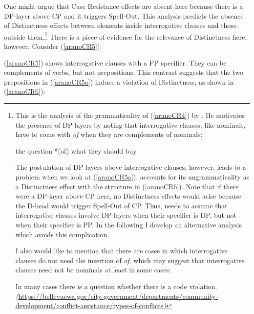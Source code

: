\documentclass[output=paper]{langscibook}
\begin{document}
\noindent One might argue that Case Resistance effects are absent here because there is a DP-layer above CP and it triggers Spell-Out. This analysis predicts the absence of Distinctness effects between elements inside interrogative clauses and those outside them.\footnote{This is the analysis of the grammaticality of (\ref{aranoCR4}) by \citet[139, 215 fn. 67]{Richards:2010}. He motivates the presence of DP-layers by noting that interrogative clauses, like nominals, have to come with \emph{of} when they are complements of nominals:

\renewcommand{\exfont}{\itshape} \settowidth\jamwidth{}
\ea 
the question *(of) {\ob}what they should buy{\cb} \\ \upshape \citep[139]{Richards:2010}
\z 

The postulation of  DP-layers above interrogative clauses, however, leads to a problem when we look at (\ref{aranoCR5a}). \cite{Richards:2010} accounts for its ungrammaticality as a Distinctness effect with the structure in (\ref{aranoCR6}). Note that if there were a DP-layer above CP here, no Distinctness effects would arise because the D-head would trigger Spell-Out of CP\@. Thus, \cite{Richards:2010} needs to assume that interrogative clauses involve DP-layers when their specifier is DP, but not when their specifier is PP\@. In the following I develop an alternative analysis which avoids this complication. 

I also would like to mention that there are cases in which interrogative clauses do not need the insertion of \emph{of}, which may suggest that interrogative clauses need not be nominals at least in some cases:

\renewcommand{\exfont}{\itshape} \settowidth\jamwidth{}
\ea 
In many cases there is a question whether there is a code violation. \\
\emph{(}\url{https://bellevuewa.gov/city-government/departments/community-development/conflict-assistance/types-of-conflicts}\emph{)}
\z

} There is a piece of evidence for the relevance of Distinctness here, however. Consider (\ref{aranoCR5}):

\ea \label{aranoCR5}
\label{aranoCR5a} 
\z
\z 

\noindent (\ref{aranoCR5}) shows interrogative clauses with a PP specifier. They can be complements of verbs, but not prepositions. This contrast suggests that the two prepositions in (\ref{aranoCR5a}) induce a violation of Distinctness, as shown in (\ref{aranoCR6}):
\end{document}
